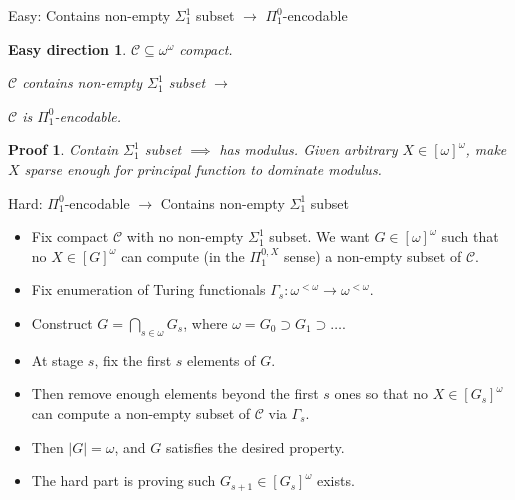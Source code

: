 \documentclass[notes]{beamer}
\begin{document}
\begin{frame}{Easy: Contains non-empty $\Sigma_1^1$ subset $\rightarrow$
$\Pi_1^0$-encodable}
  \newtheorem{main-easy}{Easy direction}
  \begin{main-easy}
    $\mathcal{C}\subseteq \omega^{\omega}$ compact.

    $\mathcal{C}$ contains non-empty $\Sigma_1^1$ subset
    $\rightarrow$

    $\mathcal{C}$ is $\Pi_1^0$-encodable.
  \end{main-easy}

  \newtheorem{pf-easy}{Proof}
  \begin{pf-easy}
    Contain $\Sigma_1^1$ subset $\implies$ has modulus. Given arbitrary
    $X\in[\omega]^\omega$, make $X$ sparse enough for principal function to
    dominate modulus.
  \end{pf-easy}
\end{frame}

\begin{frame}{Hard: $\Pi_1^0$-encodable $\rightarrow$ Contains
non-empty $\Sigma_1^1$ subset}
  \begin{itemize}
    \item Fix compact $\mathcal{C}$ with no non-empty $\Sigma_1^1$ subset.
      We want $G\in[\omega]^\omega$ such that no $X\in[G]^\omega$
      can compute (in the $\Pi_1^{0,X}$ sense) a non-empty subset of
      $\mathcal{C}$.

    \item Fix enumeration of Turing functionals $\Gamma_s:\omega^{<\omega}
      \rightarrow \omega^{<\omega}$.

    \item Construct $G=\bigcap_{s\in\omega}G_s$, where
      $\omega=G_0\supset G_1\supset\ldots$.
      
    \item At stage $s$, fix the first $s$ elements of $G$.
    
    \item Then remove enough elements beyond the first $s$ ones so that no
      $X\in[G_s]^\omega$ can compute a non-empty subset of $\mathcal{C}$
      via $\Gamma_s$.

    \item Then $|G|=\omega$, and $G$ satisfies the desired property.

    \item The hard part is proving such $G_{s+1}\in[G_s]^\omega$ exists.
  \end{itemize}
\end{frame}
\end{document}
